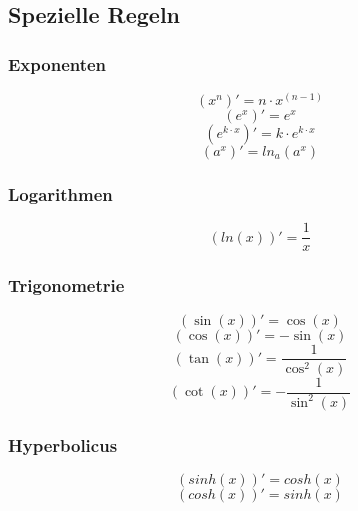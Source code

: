 \newpage

\subsection{Spezielle Regeln}

\subsubsection{Exponenten}
\[ \boxed{ (x^n)' = n\cdot x^{(n-1)} } \]
\[ \boxed{ (e^x)' = e^x } \]
\[ \boxed{ (e^{k\cdot x})' = k \cdot e^{k\cdot x} } \]
\[ \boxed{ (a^x)' = ln_a (a^x) } \]

\subsubsection{Logarithmen}
\[ \boxed{ (ln(x))' = \frac{1}{x} } \]  

\subsubsection{Trigonometrie}
\[ \boxed{ (\sin(x))' = \cos(x) } \]  
\[ \boxed{ (\cos(x))' = -\sin(x) } \] 
\[ \boxed{ (\tan(x))' = \frac{1}{\cos^2(x)} } \]  
\[ \boxed{ (\cot(x))' = -\frac{1}{\sin^2(x)} } \]

\subsubsection{Hyperbolicus}
\[ \boxed{(sinh(x))' = cosh(x)} \]
\[ \boxed{(cosh(x))' = sinh(x)} \]
